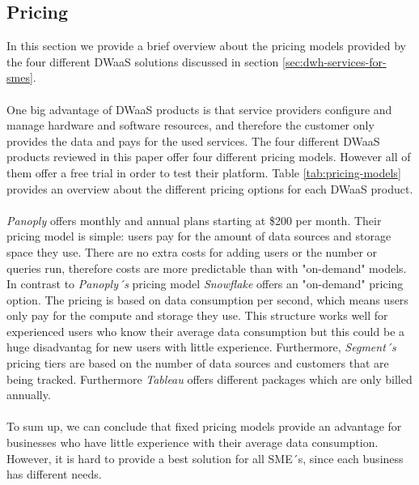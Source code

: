 \documentclass[../paper.tex]{subfiles}
\begin{document}
    
\subsection{Pricing}
In this section we provide a brief overview about the pricing models provided by the four different DWaaS solutions discussed in section \ref{sec:dwh-services-for-smes}.
\\  \\
One big advantage of DWaaS products is that service providers configure and manage hardware and software resources, and therefore the customer only provides the data and pays for the used services.
The four different DWaaS products reviewed in this paper offer four different pricing models. However all of them offer a free trial in order to test their platform. Table \ref{tab:pricing-models} provides an overview about the different pricing options for each DWaaS product.\\ \\
\textit{Panoply} offers monthly and annual plans starting at \$200 per month. Their pricing model is simple: users pay for the amount of data sources and storage space they use. There are no extra costs for adding users or the number or queries run, therefore costs are more predictable than with "on-demand" models. In contrast to \textit{Panoply´s} pricing model \textit{Snowflake} offers an "on-demand" pricing option. The pricing is based on data consumption per second, which means users only pay for the compute and storage they use. This structure works well for experienced users who know their average data consumption but this could be a huge disadvantag for new users with little experience. Furthermore, \textit{Segment´s} pricing tiers are based on the number of data sources and customers that are being tracked. Furthermore \textit{Tableau} offers different packages which are only billed annually. \\ \\
To sum up, we can conclude that fixed pricing models provide an advantage for businesses who have little experience with their average data consumption. However, it is hard to provide a best solution for all SME´s, since each business has different needs. 
\end{document}
